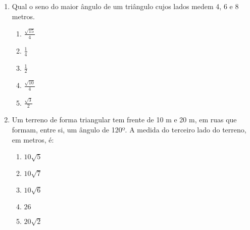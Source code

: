 \documentclass[twocolumn,oneside,a4paper,12pt]{article}
\begin{document}
\begin{enumerate}
\item Qual o seno do maior ângulo de um triângulo cujos lados medem 4, 6 e 8 metros.
\begin{enumerate}
\item \(\frac{\sqrt{15}}{4}\)
\item \(\frac{1}{4}\)
\item \(\frac{1}{2}\)
\item \(\frac{\sqrt{10}}{4}\)
\item \(\frac{\sqrt{3}}{2}\)
\end{enumerate}

\item Um terreno de forma triangular tem frente de 10 m e 20 m, em ruas que formam, entre si, um ângulo de 120º. A medida do terceiro lado do terreno, em metros, é:
\begin{enumerate}
\item \(10\sqrt{5}\)
\item \(10\sqrt{7}\)
\item \(10\sqrt{6}\)
\item \(26\)
\item \(20\sqrt{2}\)
\end{enumerate}

\end{enumerate}
\end{document}
